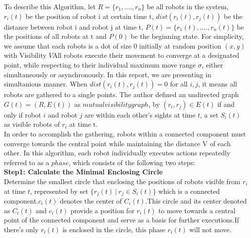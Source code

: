 \documentclass[]{report}
\begin{document}
To describe this Algorithm, let $R = \{r_1,....,r_n\}$ be all robots in the system, $r_i(t)$ be the position of robot i at certain time t, $dist(r_i(t), r_j(t))$ be the distance between robot i and robot j at time t, $P(t) = \{r_1(t),....,r_n(t)\}$  be the positions of all robots at t and $P(0)$ be the beginning state. For simplicity, we assume that each robots is a dot of size 0 initially at random position $(x, y)$ with Visibility $V$All robots execute their movement to converge at a designated point, while respecting to their individual maximum move range $\sigma$, either simultaneously or asynchronously. In this report, we are presenting in simultanious manner. When $dist(r_i(t),r_j(t)) = 0$ for all $i, j$, it means all robots are gathered to a single points. The author defined an undirected graph $G(t) = (R, E(t))$ as $mutual visibility graph$, by $(r_i, r_j) \in E(t)$ if and only if robot $i$ and robot $j$ are within each other's sights at time $t$, a set $S_i(t)$ as visible robots of $r_i$ at time t. \\


In order to accomplish the gathering, robots within a connected component must converge towards the central point while maintaining the distance V of each other. In this algorithm, each robot individually executes actions repeatedly referred to as a $phase$, which consists of the following two steps:\\

\textbf{Step1: Calculate the Minimal Enclosing Circle}\\
Determine the smallest circle that enclosing the positions of robots visible from $r_i$ at time $t$, represented by set $\{r_j(t)\ | \ r_j \in S_i(t)\}$ which is a connected component.$c_i(t)$ denotes the center of $C_i(t)$.This circle and its center denoted as $C_i(t)$ and $c_i(t)$ provide a position for $r_i(t)$ to move towards a central point of the connected component and serve as a basis for further executions.If there's only \(r_i(t)\) is enclosed in the circle, this phase \(r_i(t)\) will not move. 
\end{document}

